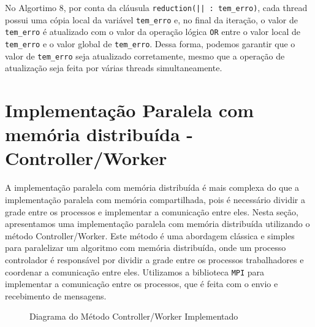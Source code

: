 \documentclass[conference]{IEEEtran}
\begin{document}
No Algortimo 8, por conta da cláusula \texttt{reduction(|| : tem\_erro)}, cada thread possui uma cópia local da variável \texttt{tem\_erro} e, no final da iteração, o valor de \texttt{tem\_erro} é atualizado com o valor da operação lógica \texttt{OR} entre o valor local de \texttt{tem\_erro} e o valor global de \texttt{tem\_erro}. Dessa forma, podemos garantir que o valor de \texttt{tem\_erro} seja atualizado corretamente, mesmo que a operação de atualização seja feita por várias threads simultaneamente.

\section{Implementação Paralela com memória distribuída - Controller/Worker}

A implementação paralela com memória distribuída é mais complexa do que a implementação paralela com memória compartilhada, pois é necessário dividir a grade entre os processos e implementar a comunicação entre eles. Nesta seção, apresentamos uma implementação paralela com memória distribuída utilizando o método Controller/Worker\cite{controller_worker}. Este método é uma abordagem clássica e simples para paralelizar um algoritmo com memória distribuída, onde um processo controlador é responsável por dividir a grade entre os processos trabalhadores e coordenar a comunicação entre eles. Utilizamos a biblioteca \texttt{MPI} para implementar a comunicação entre os processos, que é feita com o envio e recebimento de mensagens.

\begin{figure}[h]
    \centering
    \caption{Diagrama do Método Controller/Worker Implementado}
    \label{fig:controller-worker}
\end{figure}
\end{document}
